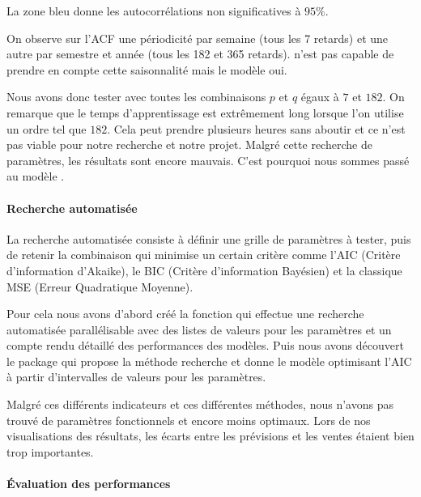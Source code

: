 La zone bleu donne les autocorrélations non significatives à $95\%$.

On observe sur l'ACF une périodicité par semaine (tous les 7 retards) et une autre par semestre et année (tous les 182 et 365 retards). \ARIMA n'est pas capable de prendre en compte cette saisonnalité mais le modèle \SARIMA oui.

Nous avons donc tester \ARIMA avec toutes les combinaisons $p$ et $q$ égaux à $7$ et $182$. On remarque que le temps d'apprentissage est extrêmement long lorsque l'on utilise un ordre tel que $182$. Cela peut prendre plusieurs heures sans aboutir et ce n'est pas viable pour notre recherche et notre projet. Malgré cette recherche de paramètres, les résultats sont encore mauvais. C'est pourquoi nous sommes passé au modèle \SARIMA.

\paragraph{Recherche automatisée}
\label{par:grid_search}


La recherche automatisée consiste à définir une grille de paramètres à tester, puis de retenir la combinaison qui minimise un certain critère comme l'AIC (Critère d'information d'Akaike), le BIC (Critère d'information Bayésien) et la classique MSE (Erreur Quadratique Moyenne).

Pour cela nous avons d'abord créé la fonction  qui effectue une recherche automatisée parallélisable avec des listes de valeurs pour les paramètres et un compte rendu détaillé des performances des modèles.
Puis nous avons découvert le package  qui propose la méthode  recherche et donne le modèle optimisant l'AIC à partir d'intervalles de valeurs pour les paramètres.

Malgré ces différents indicateurs et ces différentes méthodes, nous n'avons pas trouvé de paramètres fonctionnels et encore moins optimaux. Lors de nos visualisations des résultats, les écarts entre les prévisions et les ventes étaient bien trop importantes.

\paragraph{Évaluation des performances}
\label{par:eval_perf}

